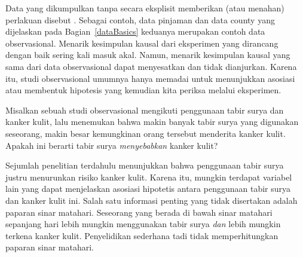 Data yang dikumpulkan tanpa secara eksplisit memberikan
(atau menahan) perlakuan disebut .
Sebagai contoh, data pinjaman dan data county yang dijelaskan pada
Bagian~\ref{dataBasics}
keduanya merupakan contoh data observasional.
Menarik kesimpulan kausal dari eksperimen yang dirancang dengan baik sering
kali masuk akal. Namun, menarik kesimpulan kausal yang sama dari data
observasional dapat menyesatkan dan tidak dianjurkan.
Karena itu, studi observasional umumnya hanya memadai untuk menunjukkan
asosiasi atau membentuk hipotesis yang kemudian kita periksa melalui
eksperimen.

\begin{exercisewrap}
\begin{nexercise}\label{sunscreenLurkingExample}%
Misalkan sebuah studi observasional mengikuti penggunaan tabir surya dan
kanker kulit, lalu menemukan bahwa makin banyak tabir surya yang digunakan
seseorang, makin besar kemungkinan orang tersebut menderita kanker kulit.
Apakah ini berarti tabir surya \emph{menyebabkan} kanker kulit?\footnotemark
\end{nexercise}
\end{exercisewrap}

Sejumlah penelitian terdahulu menunjukkan bahwa penggunaan tabir surya justru
menurunkan risiko kanker kulit. Karena itu, mungkin terdapat variabel lain yang
dapat menjelaskan asosiasi hipotetis antara penggunaan tabir surya dan kanker
kulit ini. Salah satu informasi penting yang tidak disertakan adalah paparan
sinar matahari. Seseorang yang berada di bawah sinar matahari sepanjang hari
lebih mungkin menggunakan tabir surya \emph{dan} lebih mungkin terkena kanker
kulit. Penyelidikan sederhana tadi tidak memperhitungkan paparan sinar matahari.
\begin{center}
\end{center}

